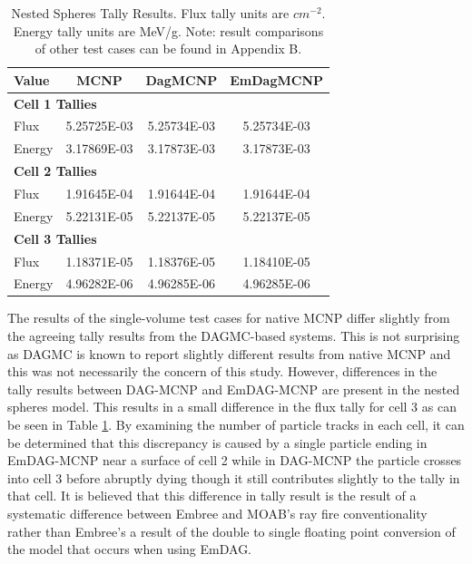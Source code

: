 \documentclass[10pt, a4paper]{article}
\begin{document}
\begin{table}[H]
  \small
  \begin{center}
    \caption{Nested Spheres Tally Results. Flux tally units are $cm^{-2}$. Energy tally units are MeV/g. Note: result comparisons of other test cases can be found in Appendix B.}
    \label{nestedspheres}
    \begin{tabular}{lccc}
      \toprule
      Value & MCNP & DagMCNP & EmDagMCNP \\
      \toprule
      \multicolumn{4}{l}{\textbf{Cell 1 Tallies}} \\
      \hline
      Flux  & 5.25725E-03 & 5.25734E-03 & 5.25734E-03 \\
      Energy  & 3.17869E-03 &  3.17873E-03 &  3.17873E-03 \\
      \hline
      \multicolumn{4}{l}{\textbf{Cell 2 Tallies}} \\
      \hline
      Flux  & 1.91645E-04 & 1.91644E-04 & 1.91644E-04 \\
      Energy  & 5.22131E-05 & 5.22137E-05 & 5.22137E-05 \\
      \hline
      \multicolumn{4}{l}{\textbf{Cell 3 Tallies}} \\
      \hline
      Flux  & 1.18371E-05 & 1.18376E-05 & 1.18410E-05 \\
      Energy  & 4.96282E-06 & 4.96285E-06 & 4.96285E-06 \\
      \bottomrule
                        
    \end{tabular}

  \end{center}
\end{table}


The results of the single-volume test cases for native MCNP differ slightly from the agreeing tally results from the DAGMC-based systems. This is not surprising as DAGMC is known to report slightly different results from native MCNP and this was not necessarily the concern of this study. However, differences in the tally results between DAG-MCNP and EmDAG-MCNP are present in the nested spheres model. This results in a small difference in the flux tally for cell 3 as can be seen in Table \ref{nestedspheres}. By examining the number of particle tracks in each cell, it can be determined that this discrepancy is caused by a single particle ending in EmDAG-MCNP near a surface of cell 2 while in DAG-MCNP the particle crosses into cell 3 before abruptly dying though it still contributes slightly to the tally in that cell. It is believed that this difference in tally result is the result of a systematic difference between Embree and MOAB's ray fire conventionality rather than Embree's a result of the double to single floating point conversion of the model that occurs when using EmDAG.
\end{document}
